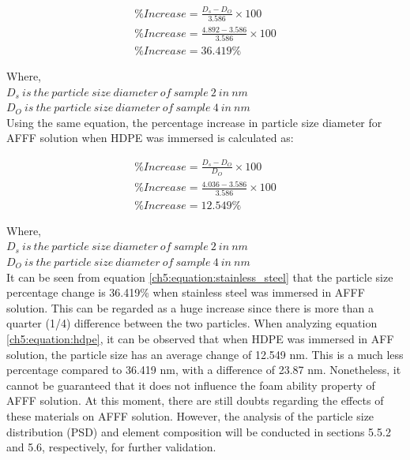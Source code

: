 \documentclass[12pt]{report}
\begin{document}
\begin{gather}
    \%Increase = \frac{D_s - D_O}{3.586} \times 100 \\ 
    \nonumber \%Increase = \frac{4.892 - 3.586}{3.586}\times 100 \\
    \nonumber \%Increase = 36.419\%
    \label{ch5:equation:stainless_steel}
\end{gather}

Where, \\
$D_s\ is\ the\ particle\ size\ diameter\ of\ sample\ 2\ in\ nm$ \\
$D_O\ is\ the\ particle\ size\ diameter\ of\ sample\ 4\ in\ nm$ \\

Using the same equation, the percentage increase in particle size diameter for AFFF solution when HDPE was immersed is calculated as:  

\begin{gather}
    \%Increase = \frac{D_s - D_O}{D_O} \times 100 \\ 
    \nonumber \%Increase = \frac{4.036 - 3.586}{3.586}\times 100 \\
    \nonumber \%Increase = 12.549\% 
    \label{ch5:equation:hdpe}
\end{gather}
 
Where, \\
$D_s\ is\ the\ particle\ size\ diameter\ of\ sample\ 2\ in\ nm$ \\
$D_O\ is\ the\ particle\ size\ diameter\ of\ sample\ 4\ in\ nm$ \\

It can be seen from equation \ref{ch5:equation:stainless_steel} that the particle size percentage change is 36.419\% when stainless steel was immersed in AFFF solution. This can be regarded as a huge increase since there is more than a quarter (1/4) difference between the two particles. When analyzing equation \ref{ch5:equation:hdpe}, it can be observed that when HDPE was immersed in AFF solution, the particle size has an average change of 12.549 nm. This is a much less percentage compared to 36.419 nm, with a difference of 23.87 nm. Nonetheless, it cannot be guaranteed that it does not influence the foam ability property of AFFF solution.  At this moment, there are still doubts regarding the effects of these materials on AFFF solution. However, the analysis of the particle size distribution (PSD) and element composition will be conducted in sections 5.5.2 and 5.6, respectively, for further validation.
\end{document}

